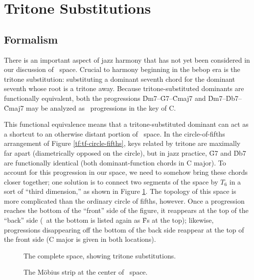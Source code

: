 



\section{Tritone Substitutions}
\label{sec:tf-space-tritones}

\subsection{Formalism}

There is an important aspect of jazz harmony that has not yet been considered in
our discussion of \tf\ space. Crucial to harmony beginning in the bebop era is
the tritone substitution: substituting a dominant seventh chord for the
dominant seventh whose root is a tritone away. Because
tritone-substituted dominants are functionally equivalent, both the
progressions \h{Dm7}--\h{G7}--\h{Cmaj7} and \h{Dm7}--\h{Db7}--\h{Cmaj7} may be
analyzed as \tfo\ progressions in the key of C.

This functional equivalence means that a tritone-substituted dominant can
act as a shortcut to an otherwise distant portion of \tf\ space. In the
circle-of-fifths arrangement of Figure \ref{tf:tf-circle-fifths}, keys related
by tritone are maximally far apart (diametrically opposed on the circle), but
in jazz practice, \h{G7} and \h{Db7} are functionally identical (both
dominant-function chords in C major). To account for this progression in our
space, we need to somehow bring these chords closer together; one solution is
to connect two segments of the space by $T_6$ in a sort of ``third
dimension,'' as shown in Figure \ref{tft:complete-space}. The topology of this
space is more complicated than the ordinary circle of fifths, however. Once a
progression reaches the bottom of the ``front'' side of the figure, it
reappears at the top of the ``back'' side (\Gflat\ at the bottom is listed
again as \h{Fs} at the top); likewise, progressions disappearing off the
bottom of the back side reappear at the top of the front side (C major is
given in both locations).

\begin{figure}[tbp]
  \caption{The complete \tf space, showing tritone substitutions.}
  \label{tft:complete-space}
\end{figure}

\begin{figure}[tbp]
  \caption{The Möbius strip at the center of \tf\ space.}
  \label{tft:mobius-dominants}
\end{figure}

